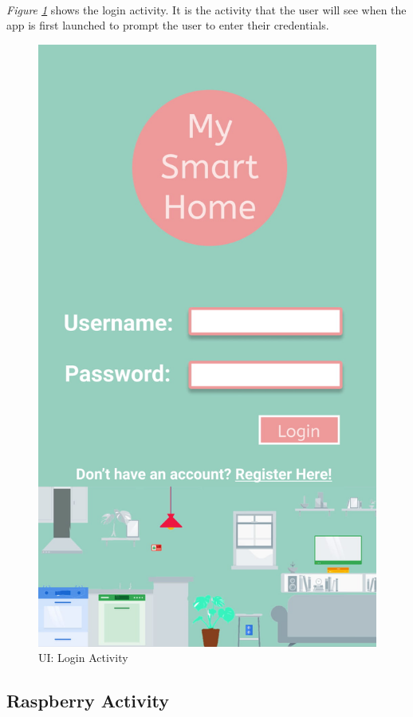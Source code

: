 \documentclass[12pt, oneside, a4paper]{book}
\begin{document}
		\paragraph{} \textit{Figure \ref{fig:activity_login}} shows the login activity. It is the activity that the user will see when the app is first launched to prompt the user to enter their credentials.
		\begin{figure}[H]
			\centering
			\includegraphics[width=.5\linewidth]{img/activity_login1.jpg}
			\caption{UI: Login Activity}
			\label{fig:activity_login}
		\end{figure}
		\newpage\subsection{Raspberry Activity}
\end{document}
